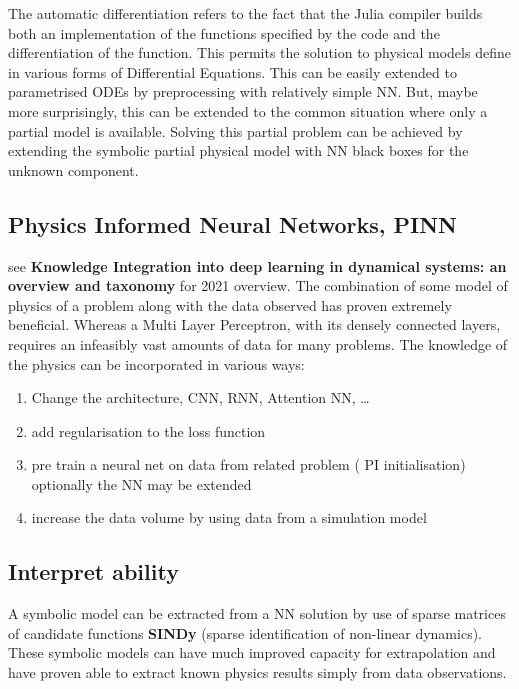 The automatic differentiation refers to the fact that the Julia compiler builds both an implementation of the functions specified by the code and the differentiation of the function. This permits the solution to physical models define in various forms of Differential Equations.   This can be easily extended to parametrised ODEs by preprocessing with relatively simple NN. But,  maybe more surprisingly, this can be extended to the common situation where only a partial model is available. Solving this partial problem can be achieved by extending the symbolic partial physical model with NN black boxes for the unknown component.



\subsection{Physics Informed Neural Networks, PINN}

see {\bf Knowledge Integration into deep learning in dynamical systems: an overview and taxonomy} for 2021 overview.
The combination of some model of  physics of a problem along with the data observed has proven extremely beneficial. Whereas a Multi Layer Perceptron, with its densely connected layers, requires an infeasibly vast amounts of data for many problems. The knowledge of the physics can be incorporated in various ways:
\begin{enumerate}
\item Change the architecture, CNN, RNN, Attention NN, \ldots
\item add regularisation to the loss function
\item pre train a neural net on data from related problem 
( PI initialisation) optionally the NN may be extended
\item increase the data volume by using data from a  simulation model
\end{enumerate}

\subsection{Interpret ability} 

A symbolic model can be extracted from a NN solution by use of sparse matrices of candidate functions {\bf SINDy} (sparse identification of non-linear dynamics).  These symbolic models can have much improved capacity for extrapolation and have proven able to extract known physics results simply from data observations.



